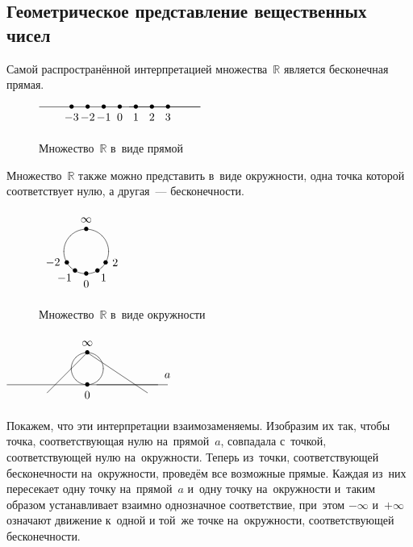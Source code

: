 \subsection{Геометрическое представление вещественных чисел}
Самой распространённой интерпретацией множества~$\mathbb R$ является бесконечная прямая.
\begin{figure}[h] \centering
\noindent
$\begin{xy} /r5mm/:
(0, 0) *{\bullet} *++!U{0};
(5, 0) **@{-};
(-5, 0) **@{-};
(1, 0) *{\bullet} *++!U{1};
(2, 0) *{\bullet} *++!U{2};
(3, 0) *{\bullet} *++!U{3};
(-1, 0) *{\bullet} *++!U{-1};
(-2, 0) *{\bullet} *++!U{-2};
(-3, 0) *{\bullet} *++!U{-3};
\end{xy}$
\caption{Множество~$\mathbb R$ в~виде прямой}
\end{figure}

Множество~$\mathbb R$ также можно представить в~виде окружности, одна точка которой соответствует нулю, а другая~--- бесконечности.
\begin{figure}[h] \centering
\noindent
$\begin{xy} /r7mm/:
(0, 0) *\cir<7mm>{};
(-0.8660, -0.5) *{\bullet} *++!R{-2};
(-0.5, -0.8660) *{\bullet} *+!UR{-1};
(0, -1) *{\bullet} *++!U{0};
(0.5, -0.8660) *{\bullet} *+!UL{1};
(0.8660, -0.5) *{\bullet} *++!L{2};
(0, 1) *{\bullet} *++!D{\infty};
\end{xy}$
\caption{Множество~$\mathbb R$ в~виде окружности}
\end{figure}

\begin{floatingfigure}[r]{54mm}
\noindent
$\begin{xy} /r5mm/:
(0, 0) *{\bullet} *++!U{0};
(5, 0) **@{-} *++!D{a};
(-5, 0) **@{-};
(0, 1) *\cir<5mm>{};
(0, 2) = "inf" *{\bullet} *++!D{\infty};
(3.75, -0.5) **@{-};
"inf"; (-2.5, -0.5) **@{-};
\end{xy}$
\end{floatingfigure}
Покажем, что эти интерпретации взаимозаменяемы.
Изобразим их так, чтобы точка, соответствующая нулю на~прямой~$a$, совпадала с~точкой, соответствующей нулю на~окружности.
Теперь из~точки, соответствующей бесконечности на~окружности, проведём все возможные прямые.
Каждая из~них пересекает одну точку на~прямой~$a$ и~одну точку на~окружности и~таким образом устанавливает взаимно однозначное соответствие, при~этом $-\infty$ и~$+\infty$ означают движение к~одной и той~же точке на~окружности, соответствующей бесконечности.